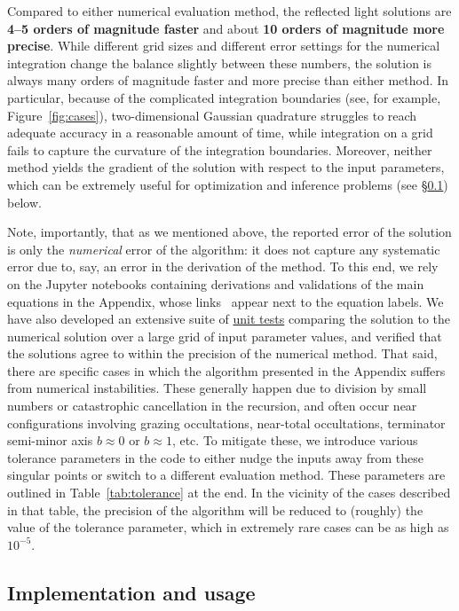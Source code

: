 \documentclass[modern]{aastex62}
\begin{document}
Compared to either numerical evaluation method, the \starry reflected light
solutions are
\textbf{4--5 orders of magnitude faster} and about
\textbf{10 orders of magnitude more precise}. While different
grid sizes and different error settings for the numerical integration change
the balance slightly between these numbers, the \starry solution is always
many orders of magnitude faster and more precise than either method.
In particular, because of the complicated integration boundaries
(see, for example, Figure~\ref{fig:cases}), two-dimensional Gaussian quadrature
struggles to reach adequate accuracy in a reasonable amount of time,
while integration on a grid fails to capture the curvature of the
integration boundaries. Moreover, neither method yields the gradient of the
solution with respect to the input parameters, which can be extremely useful
for optimization and inference problems (see \S\ref{sec:usage}) below.

Note, importantly, that as we mentioned above, the reported error of the \starry
solution is only the \emph{numerical} error of the algorithm: it does not
capture any systematic error due to, say, an error in the derivation of
the method. To this end, we rely on the Jupyter notebooks containing
derivations and validations of the main equations in the Appendix, whose
links \prooficon\, appear next to the equation labels.
%
We have also developed an extensive suite of
\href{https://github.com/rodluger/starry/tree/master/tests}{unit tests}
comparing the \starry solution to the numerical solution over a large
grid of input parameter values, and verified that the solutions agree
to within the precision of the numerical method.
%
That said, there are specific cases in which the algorithm presented in the
Appendix suffers from numerical instabilities. These generally happen due
to division by small numbers or catastrophic cancellation in the recursion,
and often occur near configurations involving grazing occultations,
near-total occultations, terminator semi-minor axis $b \approx 0$ or
$b \approx 1$, etc. To mitigate these, we introduce various tolerance
parameters in the code to either nudge the inputs away from these singular
points or switch to a different evaluation method. These parameters are
outlined in Table~\ref{tab:tolerance} at the end. In the vicinity of the cases
described in that table, the precision of the \starry algorithm will be
reduced to (roughly) the value of the tolerance parameter, which in
extremely rare cases can be as high as $10^{-5}$.

\subsection{Implementation and usage}
\label{sec:usage}
\end{document}
